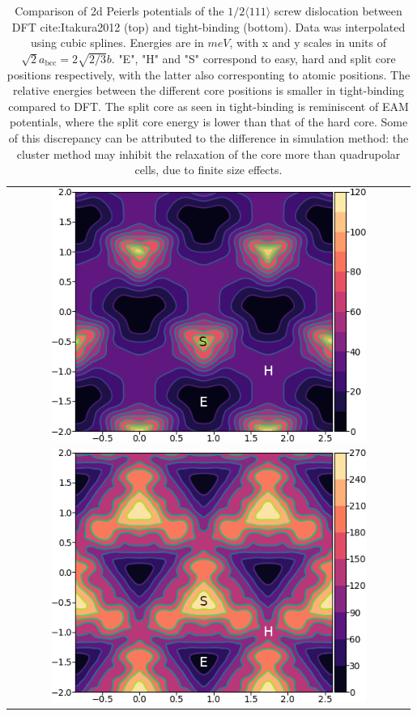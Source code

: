 \documentclass[a4paper]{article}
\begin{document}
        \begin{table}
    \begin{tabular}{c}
	     \includegraphics[width=0.8\textwidth]{../Images/itakura_dislocation_energy_landscape_2_labelled.png} \\
             \includegraphics[width=0.8\textwidth]{../Images/tbe_dislocation_energy_landscape_2_labelled.png}  \\
    \end{tabular}		
\caption{Comparison of 2d Peierls potentials of the $1/2\langle 111\rangle$ screw dislocation between DFT cite:Itakura2012 (top) and tight-binding (bottom). Data was interpolated using cubic splines. Energies are in $meV$, with x and y scales in units of $\sqrt{2} a_{\text{bcc}} = 2\sqrt{2/3}b$. "E", "H" and "S" correspond to easy, hard and split core positions respectively, with the latter also corresponting to atomic positions. The relative energies between the different core positions is smaller in tight-binding compared to DFT. The split core as seen in tight-binding is reminiscent of EAM potentials, where the split core energy is lower than that of the hard core. Some of this discrepancy can be attributed to the difference in simulation method: the cluster method may inhibit the relaxation of the core more than quadrupolar cells, due to finite size effects.}
	\label{fig:peierlspot2}
    \end{table}
\end{document}
